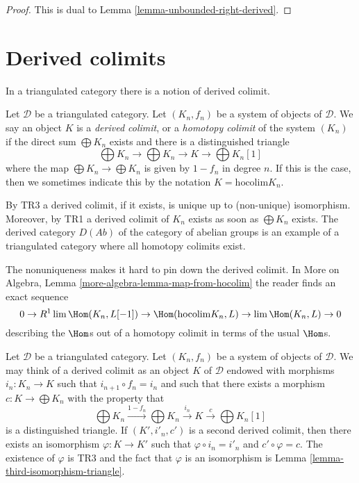 \begin{proof}
This is dual to Lemma \ref{lemma-unbounded-right-derived}.
\end{proof}






\section{Derived colimits}
\label{section-derived-colimit}

\noindent
In a triangulated category there is a notion of derived colimit.

\begin{definition}
\label{definition-derived-colimit}
Let $\mathcal{D}$ be a triangulated category.
Let $(K_n, f_n)$ be a system of objects of $\mathcal{D}$.
We say an object $K$ is a {\it derived colimit}, or a
{\it homotopy colimit} of the system $(K_n)$ if
the direct sum $\bigoplus K_n$ exists and there is a distinguished triangle
$$
\bigoplus K_n \to \bigoplus K_n \to K \to \bigoplus K_n[1]
$$
where the map $\bigoplus K_n \to \bigoplus K_n$ is given
by $1 - f_n$ in degree $n$. If this is the
case, then we sometimes indicate this by the notation
$K = \text{hocolim} K_n$.
\end{definition}

\noindent
By TR3 a derived colimit, if it exists, is unique up to (non-unique)
isomorphism. Moreover, by TR1 a derived colimit of $K_n$ exists
as soon as $\bigoplus K_n$ exists. The derived category $D(\textit{Ab})$
of the category of abelian groups is an example of a triangulated
category where all homotopy colimits exist.

\medskip\noindent
The nonuniqueness makes it hard to pin down the derived colimit. In
More on Algebra, Lemma \ref{more-algebra-lemma-map-from-hocolim}
the reader finds an exact sequence
$$
0 \to R^1\lim \Hom(K_n, L[-1]) \to \Hom(\text{hocolim} K_n, L)
\to \lim \Hom(K_n, L) \to 0
$$
describing the $\Hom$s out of a homotopy colimit in terms of the
usual $\Hom$s.

\begin{remark}
\label{remark-uniqueness-derived-colimit}
Let $\mathcal{D}$ be a triangulated category.
Let $(K_n, f_n)$ be a system of objects of $\mathcal{D}$.
We may think of a derived colimit as an object $K$
of $\mathcal{D}$ endowed with morphisms $i_n : K_n \to K$
such that $i_{n + 1} \circ f_n = i_n$ and such that there
exists a morphism $c : K \to \bigoplus K_n$ with the property that
$$
\bigoplus K_n \xrightarrow{1 - f_n} \bigoplus K_n \xrightarrow{i_n}
K \xrightarrow{c} \bigoplus K_n[1]
$$
is a distinguished triangle. If $(K', i'_n, c')$ is a second
derived colimit, then there exists an isomorphism
$\varphi : K \to K'$ such that $\varphi \circ i_n = i'_n$ and
$c' \circ \varphi = c$. The existence of $\varphi$ is
TR3 and the fact that $\varphi$ is an isomorphism is
Lemma \ref{lemma-third-isomorphism-triangle}.
\end{remark}

